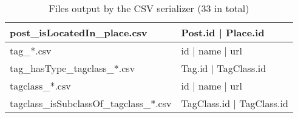\begin{table}[htb]
\begin{tabular}{|p{4.6cm}|p{9.8cm}|}
    	post\_isLocatedIn\_place.csv            & Post.id | Place.id                                                                      \\ \hline
    	tag\_*.csv                              & id | name | url                                                                         \\ \hline
    	tag\_hasType\_tagclass\_*.csv           & Tag.id | TagClass.id                                                                    \\ \hline
    	tagclass\_*.csv                         & id | name | url                                                                         \\ \hline
    	tagclass\_isSubclassOf\_tagclass\_*.csv & TagClass.id | TagClass.id                                                               \\ \hline
    \end{tabular}
    \caption{Files output by the CSV serializer (33 in total)}
    \label{table:csv}
\end{table}
